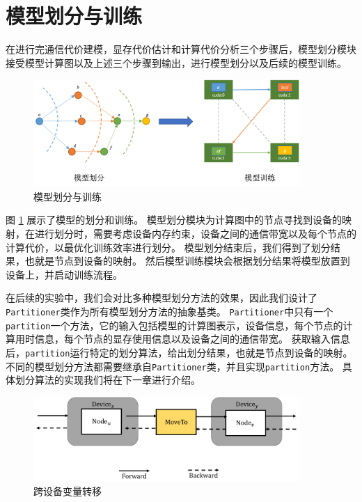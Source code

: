 \section{模型划分与训练}
\label{sec:partition-and-train}
在进行完通信代价建模，显存代价估计和计算代价分析三个步骤后，模型划分模块接受模型计算图以及上述三个步骤到输出，进行模型划分以及后续的模型训练。
\begin{figure}[h]
	\centering
	\includegraphics[width=0.9\textwidth]{./figure/3-system/partition_train.png}
	\caption{模型划分与训练}
	\label{fig:partition-and-train}
\end{figure}

图 \ref{fig:partition-and-train} 展示了模型的划分和训练。
模型划分模块为计算图中的节点寻找到设备的映射，在进行划分时，需要考虑设备内存约束，设备之间的通信带宽以及每个节点的计算代价，以最优化训练效率进行划分。
模型划分结束后，我们得到了划分结果，也就是节点到设备的映射。
然后模型训练模块会根据划分结果将模型放置到设备上，并启动训练流程。

在后续的实验中，我们会对比多种模型划分方法的效果，因此我们设计了\texttt{Partitioner}类作为所有模型划分方法的抽象基类。
\texttt{Partitioner}中只有一个\texttt{partition}一个方法，它的输入包括模型的计算图表示，设备信息，每个节点的计算用时信息，每个节点的显存使用信息以及设备之间的通信带宽。
获取输入信息后，\texttt{partition}运行特定的划分算法，给出划分结果，也就是节点到设备的映射。
不同的模型划分方法都需要继承自\texttt{Partitioner}类，并且实现\texttt{partition}方法。
具体划分算法的实现我们将在下一章进行介绍。

\begin{figure}[h]
	\centering
	\includegraphics[width=0.9\textwidth]{./figure/3-system/moveTo.pdf}
	\caption{跨设备变量转移}
	\label{fig:move}
\end{figure}


